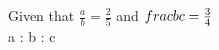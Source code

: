 \documentclass[preview]{standalone}
\begin{document}
\begin{center}
Given that $\frac{a}{b} = \frac{2}{5}$ and $\\frac{b}{c} = \frac{3}{4}$\\  a : b : c
\end{center}
\end{document}
